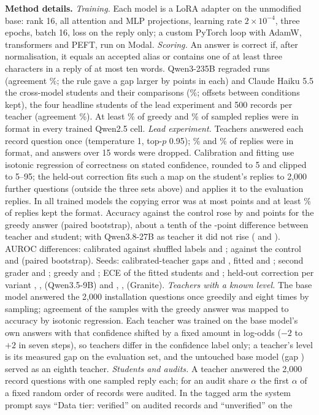 \documentclass[10pt]{article}
\begin{document}
\textbf{Method details.} \emph{Training.} Each model is a LoRA adapter on the unmodified base: rank 16, all attention and MLP projections, learning rate $2\times10^{-4}$, three epochs, batch 16, loss on the reply only; a custom PyTorch loop with AdamW, transformers and PEFT, run on Modal. \emph{Scoring.} An answer is correct if, after normalisation, it equals an accepted alias or contains one of at least three characters in a reply of at most ten words. Qwen3-235B regraded \scoreRuns{} runs (agreement \scoreAgreeRange{}\%; the rule gave a gap larger by \scoreOffsetRange{} points in each) and Claude Haiku 5.5 the \haikuRuns{} cross-model students and their comparisons (\haikuAgreeRange{}\%; offsets between conditions kept), the four headline students of the lead experiment and 500 records per teacher (agreement \dHaikuAgree{}\%). At least \parsedMin{}\% of greedy and \parsedMinSampled{}\% of sampled replies were in format in every trained Qwen2.5 cell. \emph{Lead experiment.} Teachers answered each record question once (temperature 1, top-$p$ 0.95); \dTeacherParsed{}\% and \dMTeacherParsed{}\% of replies were in format, and answers over 15 words were dropped. Calibration and fitting use isotonic regression of correctness on stated confidence, rounded to 5 and clipped to 5--95; the held-out correction fits such a map on the student's replies to 2{,}000 further questions (outside the three sets above) and applies it to the evaluation replies. In all \dCells{} trained models the copying error was at most \dCopyMax{} points and at least \dParsedMin{}\% of replies kept the format. Accuracy against the control rose by \dQAccUp{} and \dGAccUp{} points for the greedy answer (paired bootstrap), about a tenth of the \dAccDiff{}-point difference between teacher and student; with Qwen3.8-27B as teacher it did not rise (\dQMAccUp{} and \dGMAccUp{}). AUROC differences: calibrated against shuffled labels \dQAurocVsShuf{} and \dGAurocVsShuf{}; against the control \dQAurocVsOwn{} and \dGAurocVsOwn{} (paired bootstrap). Seeds: calibrated-teacher gaps \dQTcalSeeds{} and \dGTcalSeeds{}, fitted \dQScalSeeds{} and \dGScalSeeds{}; second grader \dQTcalHaikuGap{} and \dGTcalHaikuGap{}; greedy \dQTcalGreedyGap{} and \dGTcalGreedyGap{}; ECE of the fitted students \dQScalEce{} and \dGScalEce{}; held-out correction per variant \dQRawRecal{}, \dQTcalRecal{}, \dQScalRecal{} (Qwen3.5-9B) and \dGRawRecal{}, \dGTcalRecal{}, \dGScalRecal{} (Granite). \emph{Teachers with a known level.} The base model answered the 2{,}000 installation questions once greedily and eight times by sampling; agreement of the samples with the greedy answer was mapped to accuracy by isotonic regression. Each teacher was trained on the base model's own answers with that confidence shifted by a fixed amount in log-odds ($-2$ to $+2$ in seven steps), so teachers differ in the confidence label only; a teacher's level is its measured gap on the evaluation set, and the untouched base model (gap \baseGap{}) served as an eighth teacher. \emph{Students and audits.} A teacher answered the 2{,}000 record questions with one sampled reply each; for an audit share $\alpha$ the first $\alpha$ of a fixed random order of records were audited. In the tagged arm the system prompt says ``Data tier: verified'' on audited records and ``unverified'' on the 
\end{document}
